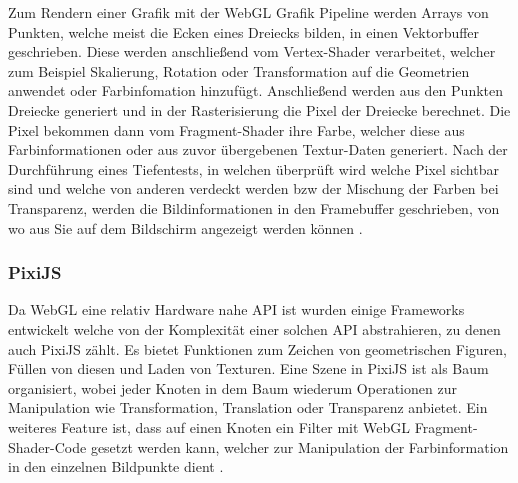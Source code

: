 Zum Rendern einer Grafik mit der WebGL Grafik Pipeline werden Arrays von Punkten, welche meist die Ecken eines Dreiecks bilden, in einen Vektorbuffer geschrieben.
Diese werden anschließend vom Vertex-Shader verarbeitet, welcher zum Beispiel Skalierung, Rotation oder Transformation auf die Geometrien anwendet oder Farbinfomation hinzufügt.
Anschließend werden aus den Punkten Dreiecke generiert und in der Rasterisierung die Pixel der Dreiecke berechnet.
Die Pixel bekommen dann vom Fragment-Shader ihre Farbe, welcher diese aus Farbinformationen oder aus zuvor übergebenen Textur-Daten generiert.
Nach der Durchführung eines Tiefentests, 
in welchen überprüft wird welche Pixel sichtbar sind und welche von anderen verdeckt werden bzw der Mischung der Farben bei Transparenz, 
werden die Bildinformationen in den Framebuffer geschrieben,
von wo aus Sie auf dem Bildschirm angezeigt werden können \cite{webgl-introduction}.


\subsubsection{PixiJS}
\label{sec:PixiJS}
Da WebGL eine relativ Hardware nahe API ist wurden einige Frameworks entwickelt welche von der Komplexität einer solchen API abstrahieren, zu denen auch PixiJS zählt.
Es bietet Funktionen zum Zeichen von geometrischen Figuren, Füllen von diesen und Laden von Texturen.
Eine Szene in PixiJS ist als Baum organisiert, wobei jeder Knoten in dem Baum wiederum Operationen zur Manipulation wie Transformation, Translation oder Transparenz anbietet.
Ein weiteres Feature ist, dass auf einen Knoten ein Filter mit WebGL Fragment-Shader-Code gesetzt werden kann, welcher zur Manipulation der Farbinformation in den einzelnen Bildpunkte dient \cite{pixijs}.

